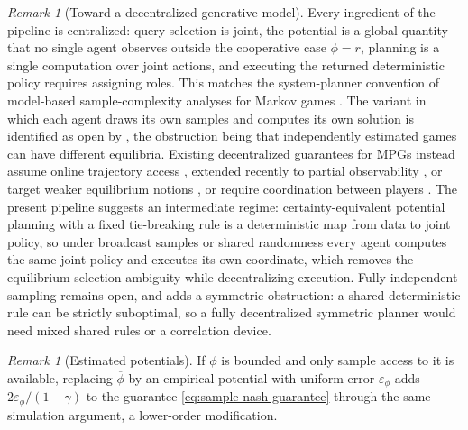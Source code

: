\documentclass{article}
\theoremstyle{plain}
\theoremstyle{definition}
\theoremstyle{remark}
\newtheorem{remark}[theorem]{Remark}
\newcommand{\quotient}[1]{\overline{#1}}
\begin{document}
\begin{remark}[Toward a decentralized generative model]
\label{rem:decentralized}
Every ingredient of the pipeline is centralized: query selection is joint,
the potential is a global quantity that no single agent observes outside the
cooperative case $\phi=r$, planning is a single computation over joint
actions, and executing the returned deterministic policy requires assigning
roles. This matches the system-planner convention of model-based
sample-complexity analyses for Markov games
\citep{zhang2020modelbased,subramanian2023robustness}. The variant in which
each agent draws its own samples and computes its own solution is identified
as open by \citet{subramanian2023robustness}, the obstruction being that
independently estimated games can have different equilibria. Existing
decentralized guarantees for MPGs instead assume online trajectory access
\citep{leonardos2022global,fox2022independent,ding2022independent,zhang2021gradient,maheshwari2022independent},
extended recently to partial observability \citep{jordan2026partially}, or
target weaker equilibrium notions \citep{jin2021vlearning,mao2022improving},
or require coordination between players \citep{song2022when}. The present
pipeline suggests an intermediate regime: certainty-equivalent potential
planning with a fixed tie-breaking rule is a deterministic map from data to
joint policy, so under broadcast samples or shared randomness every agent
computes the same joint policy and executes its own coordinate, which removes
the equilibrium-selection ambiguity while decentralizing execution. Fully
independent sampling remains open, and  adds a
symmetric obstruction: a shared deterministic rule can be strictly
suboptimal, so a fully decentralized symmetric planner would need mixed
shared rules or a correlation device.
\end{remark}

\begin{remark}[Estimated potentials]
\label{rem:unknown-potential}
If $\phi$ is bounded and only sample access to it is available, replacing
$\quotient\phi$ by an empirical potential with uniform error
$\varepsilon_\phi$ adds $2\varepsilon_\phi/(1-\gamma)$ to the guarantee
\eqref{eq:sample-nash-guarantee} through the same simulation argument, a
lower-order modification.
\end{remark}




\clearpage
\appendix
\end{document}
